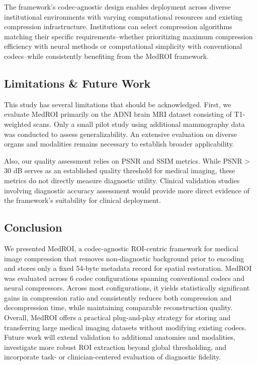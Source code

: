 \documentclass[runningheads]{llncs}
\begin{document}
The framework's codec-agnostic design enables deployment across diverse institutional environments with varying computational resources and existing compression infrastructure. Institutions can select compression algorithms matching their specific requirements--whether prioritizing maximum compression efficiency with neural methods or computational simplicity with conventional codecs--while consistently benefiting from the MedROI framework.

\subsection{Limitations \& Future Work}
This study has several limitations that should be acknowledged. First, we evaluate MedROI primarily on the ADNI brain MRI dataset consisting of T1-weighted scans. Only a small pilot study using additional mammography data was conducted to assess generalizability. An extensive evaluation on diverse organs and modalities remains necessary to establish broader applicability.

Also, our quality assessment relies on PSNR and SSIM metrics. While PSNR > 30 dB serves as an established quality threshold for medical imaging, these metrics do not directly measure diagnostic utility. Clinical validation studies involving diagnostic accuracy assessment would provide more direct evidence of the framework's suitability for clinical deployment.

\subsection{Conclusion}
\label{sec:discussion_conclusion}
We presented MedROI, a codec-agnostic ROI-centric framework for medical image compression that removes non-diagnostic background prior to encoding and stores only a fixed 54-byte metadata record for spatial restoration. MedROI was evaluated across 6 codec configurations spanning conventional codecs and neural compressors. Across most configurations, it yields statistically significant gains in compression ratio and consistently reduces both compression and decompression time, while maintaining comparable reconstruction quality. Overall, MedROI offers a practical plug-and-play strategy for storing and transferring large medical imaging datasets without modifying existing codecs. Future work will extend validation to additional anatomies and modalities, investigate more robust ROI extraction beyond global thresholding, and incorporate task- or clinician-centered evaluation of diagnostic fidelity.
\end{document}

